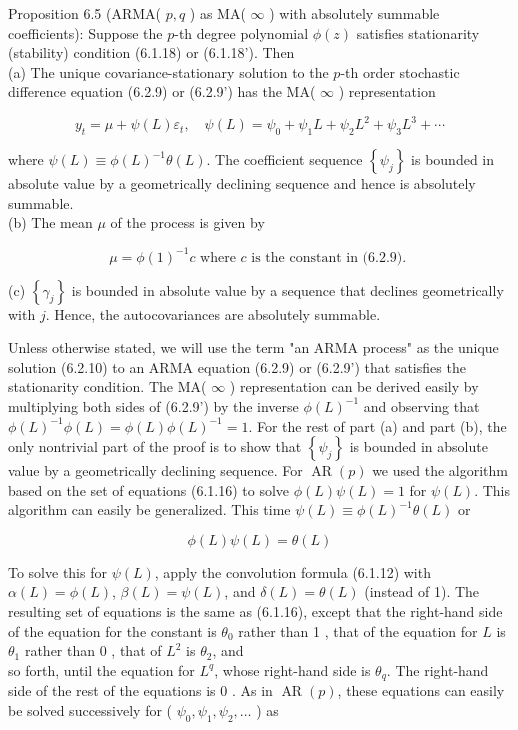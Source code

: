 \documentclass[10pt]{article}
\begin{document}
Proposition 6.5 (ARMA( $p, q$ ) as MA( $\infty$ ) with absolutely summable coefficients): Suppose the $p$-th degree polynomial $\phi(z)$ satisfies stationarity (stability) condition (6.1.18) or (6.1.18'). Then\\
(a) The unique covariance-stationary solution to the $p$-th order stochastic difference equation (6.2.9) or (6.2.9') has the MA( $\infty$ ) representation


\begin{equation*}
y_{t}=\mu+\psi(L) \varepsilon_{t}, \quad \psi(L)=\psi_{0}+\psi_{1} L+\psi_{2} L^{2}+\psi_{3} L^{3}+\cdots \tag{6.2.10}
\end{equation*}


where $\psi(L) \equiv \phi(L)^{-1} \theta(L)$. The coefficient sequence $\left\{\psi_{j}\right\}$ is bounded in absolute value by a geometrically declining sequence and hence is absolutely summable.\\
(b) The mean $\mu$ of the process is given by


\begin{equation*}
\mu=\phi(1)^{-1} c \text { where } c \text { is the constant in (6.2.9). } \tag{6.2.11}
\end{equation*}


(c) $\left\{\gamma_{j}\right\}$ is bounded in absolute value by a sequence that declines geometrically with $j$. Hence, the autocovariances are absolutely summable.

Unless otherwise stated, we will use the term "an ARMA process" as the unique solution (6.2.10) to an ARMA equation (6.2.9) or (6.2.9') that satisfies the stationarity condition. The MA( $\infty$ ) representation can be derived easily by multiplying both sides of (6.2.9') by the inverse $\phi(L)^{-1}$ and observing that $\phi(L)^{-1} \phi(L)= \phi(L) \phi(L)^{-1}=1$. For the rest of part (a) and part (b), the only nontrivial part of the proof is to show that $\left\{\psi_{j}\right\}$ is bounded in absolute value by a geometrically declining sequence. For $\operatorname{AR}(p)$ we used the algorithm based on the set of equations (6.1.16) to solve $\phi(L) \psi(L)=1$ for $\psi(L)$. This algorithm can easily be generalized. This time $\psi(L) \equiv \phi(L)^{-1} \theta(L)$ or

$$
\phi(L) \psi(L)=\theta(L)
$$

To solve this for $\psi(L)$, apply the convolution formula (6.1.12) with $\alpha(L)=\phi(L)$, $\beta(L)=\psi(L)$, and $\delta(L)=\theta(L)$ (instead of 1). The resulting set of equations is the same as (6.1.16), except that the right-hand side of the equation for the constant is $\theta_{0}$ rather than 1 , that of the equation for $L$ is $\theta_{1}$ rather than 0 , that of $L^{2}$ is $\theta_{2}$, and\\
so forth, until the equation for $L^{q}$, whose right-hand side is $\theta_{q}$. The right-hand side of the rest of the equations is 0 . As in $\operatorname{AR}(p)$, these equations can easily be solved successively for ( $\psi_{0}, \psi_{1}, \psi_{2}, \ldots$ ) as
\end{document}
